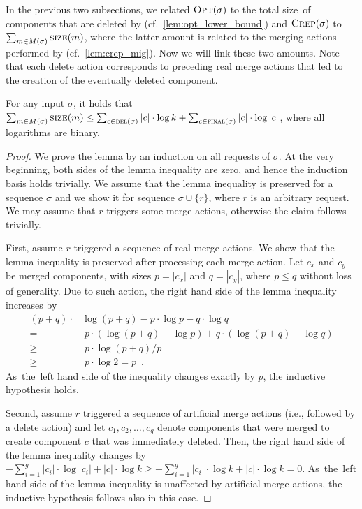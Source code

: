 In the previous two subsections, we related $\textsc{Opt}(\sigma)$ to the total
size~of components that are deleted by \CREP
(cf.~\ref{lem:opt_lower_bound}) and $\textsc{Crep}(\sigma)$ to $\sum_{m \in
M(\sigma)} \textsc{size}(m)$, where the latter amount is related to the merging
actions performed by \CREP (cf.~\ref{lem:crep_mig}). Now we will link
these two amounts. Note that each delete action corresponds to preceding real
merge actions that led to the creation of the eventually deleted component.

\begin{lemma}
\label{lem:bounding_merges}
For any input $\sigma$, it holds that 
$\sum_{m \in M(\sigma)} \textsc{size}(m) 
	\leq \sum_{c \in \textsc{del}(\sigma)} |c| \cdot \log k +
	\sum_{c \in \textsc{final}(\sigma)} |c| \cdot \log |c|$,
where all logarithms are binary.
\end{lemma}

\begin{proof}
We prove the lemma by an induction on all requests of $\sigma$. At the very beginning, both sides of the lemma
inequality are zero, and hence the induction basis holds trivially. 
We assume that the lemma inequality is preserved for a sequence $\sigma$ and we show it for 
sequence $\sigma \cup \{ r \}$, where $r$ is an arbitrary request. We may assume that $r$ 
triggers some merge actions, otherwise the claim follows trivially.

First, assume $r$ triggered a sequence of real merge actions. We show that the
lemma inequality is preserved after processing each merge action. Let $c_x$
and $c_y$ be merged components, with sizes $p = |c_x|$ and $q = |c_y|$, where
$p \leq q$ without loss of generality. Due to such action, the right hand side
of the lemma inequality increases by
\begin{align*}
  (p + q) \cdot & \log (p + q) - p \cdot \log p - q \cdot \log q \\
		= &\; p \cdot (\log (p+q) - \log p) + q \cdot (\log (p+q) - \log q) \\
		\geq &\; p \cdot \log (p+q) / p \\
		\geq &\; p \cdot \log 2 = p \enspace.
\end{align*}
As~the~left hand side of the inequality changes exactly by $p$, the inductive
hypothesis holds.

Second, assume $r$ triggered a sequence of artificial merge actions (i.e., followed by a
delete action) and let $c_1, c_2, \ldots, c_g$ denote components that were
merged to create component $c$ that was immediately deleted. Then, the right
hand side of the lemma inequality changes by $- \sum_{i = 1}^g |c_i| \cdot
\log |c_i| + |c| \cdot \log k
\geq - \sum_{i = 1}^g |c_i| \cdot \log k + |c| \cdot \log k = 0$.
As~the~left hand side of the lemma inequality is unaffected by artificial
merge actions, the inductive hypothesis follows also in this case.
\end{proof}


